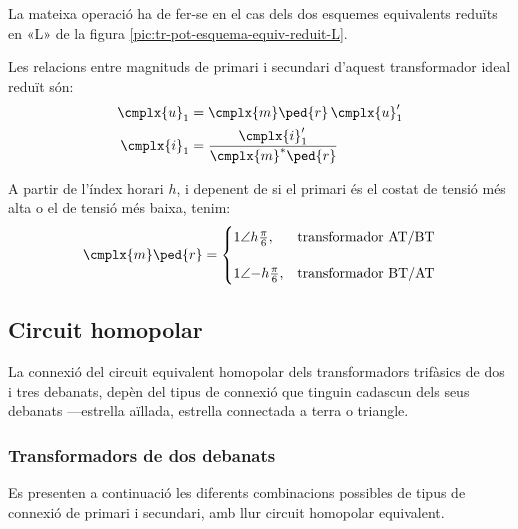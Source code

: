 \begin{center}
    
    \label{fig:esq-reduit-T-complex}
\end{center}

La mateixa operació ha de fer-se en el cas dels dos esquemes equivalents reduïts en «L» de la figura \vref{pic:tr-pot-esquema-equiv-reduit-L}.

Les relacions entre magnituds de primari i secundari d'aquest transformador ideal reduït són:
\begin{subequations}
\begin{align}
    \cmplx{u}_1 &= \cmplx{m}\ped{r}\,\cmplx{u}'_1 \label{eq:UmU-reduit}\\
    \cmplx{i}_1 &= \frac{\cmplx{i}'_1}{\cmplx{m}^*\ped{r}} \label{eq:ImI-reduit}
\end{align}
\end{subequations}

A partir de l'índex horari $h$, i depenent de si el primari és el costat de tensió més alta o el de tensió més baixa, tenim:
\begin{equation}
\cmplx{m}\ped{r} = \begin{cases}
      1\angle h\frac{\pi}{6}, & \text{transformador AT/BT}\\[2.7ex]
      1\angle{-h}\frac{\pi}{6}, & \text{transformador BT/AT}
\end{cases}
\label{eq:rel-transf-cmplx-reduit}
\end{equation}


\subsection{Circuit homopolar}\label{sec:circuit_homopolar}

La connexió del circuit equivalent homopolar dels transformadors trifàsics de dos i tres debanats, depèn del tipus de connexió que tinguin cadascun dels seus debanats ---estrella aïllada, estrella connectada a terra o triangle.

\subsubsection{Transformadors de dos debanats}\label{sec:cir-hom-2-deb}

Es presenten a continuació les diferents combinacions possibles de tipus de connexió de primari i secundari, amb llur circuit homopolar equivalent.

